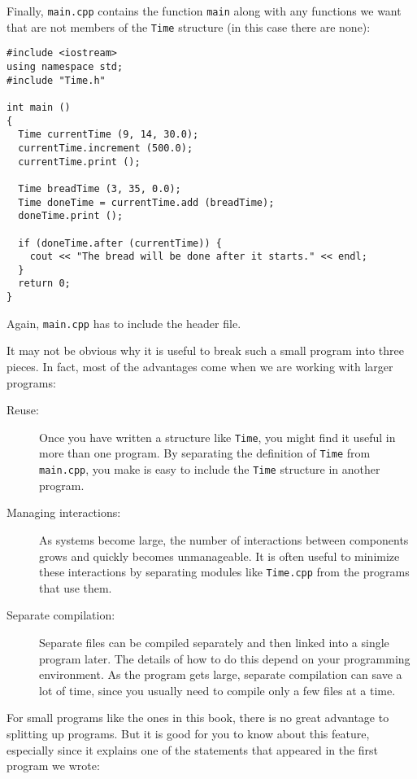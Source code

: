 {Finally, {\tt main.cpp} contains the function {\tt main} along
with any functions we want that are not members of the {\tt Time}
structure (in this case there are none):

\begin{verbatim}
#include <iostream>
using namespace std;
#include "Time.h"

int main ()
{
  Time currentTime (9, 14, 30.0);
  currentTime.increment (500.0);
  currentTime.print ();

  Time breadTime (3, 35, 0.0);
  Time doneTime = currentTime.add (breadTime);
  doneTime.print ();

  if (doneTime.after (currentTime)) {
    cout << "The bread will be done after it starts." << endl;
  }
  return 0;
}

\end{verbatim}
%
Again, {\tt main.cpp} has to include the header file.

It may not be obvious why it is useful to break such a small
program into three pieces.  In fact, most of the advantages come
when we are working with larger programs:

\begin{description}

\item[Reuse:]  Once you have written a structure like {\tt Time},
you might find it useful in more than one program.  By separating
the definition of {\tt Time} from {\tt main.cpp}, you make is easy
to include the {\tt Time} structure in another program.

\item[Managing interactions:]  As systems become large, the number
of interactions between components grows and quickly becomes
unmanageable.  It is often useful to minimize these interactions
by separating modules like {\tt Time.cpp} from the programs that
use them.

\item[Separate compilation:]  Separate files can be compiled
separately and then linked into a single program later.  The details
of how to do this depend on your programming environment.  As
the program gets large, separate compilation can save a lot of time,
since you usually need to compile only a few files at a time.

\end{description}

For small programs like the ones in this book, there is
no great advantage to splitting up programs.  But it is good
for you to know about this feature, especially since it explains
one of the statements that appeared in the first program we
wrote:

}
